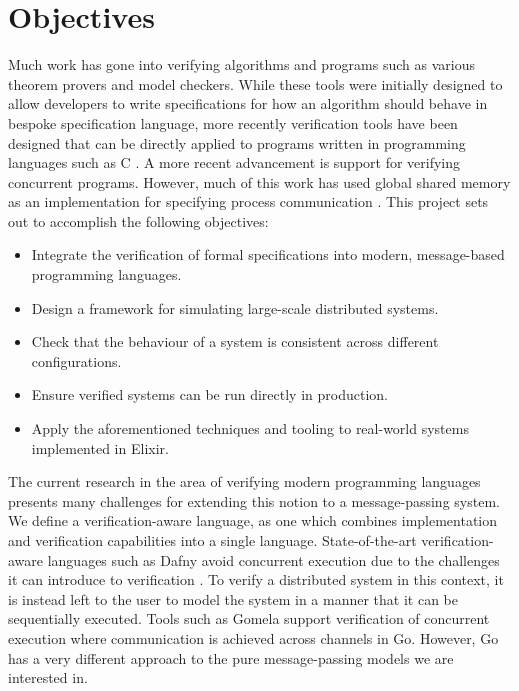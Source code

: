 \section{Objectives}
Much work has gone into verifying algorithms and programs such as various theorem provers and model checkers. While these tools were initially designed to allow developers to write specifications for how an algorithm should behave in bespoke specification language, more recently verification tools have been designed that can be directly applied to programs written in programming languages such as C \cite{c_to_promela}. A more recent advancement is support for verifying concurrent programs. However, much of this work has used global shared memory as an implementation for specifying process communication \cite{java_pathfinder}. 
This project sets out to accomplish the following objectives:
\begin{itemize}
    \item Integrate the verification of formal specifications into modern, message-based programming languages.
    \item Design a framework for simulating large-scale distributed systems.
    \item Check that the behaviour of a system is consistent across different configurations.
    \item Ensure verified systems can be run directly in production.
    \item Apply the aforementioned techniques and tooling to real-world systems implemented in Elixir.
\end{itemize}
The current research in the area of verifying modern programming languages presents many challenges for extending this notion to a message-passing system. We define a verification-aware language, as one which combines implementation and verification capabilities into a single language.  State-of-the-art verification-aware languages such as Dafny avoid concurrent execution due to the challenges it can introduce to verification \cite{dafny_concurrency}. To verify a distributed system in this context, it is instead left to the user to model the system in a manner that it can be sequentially executed. Tools such as Gomela \cite{gomela} support verification of concurrent execution where communication is achieved across channels in Go. However, Go has a very different approach to the pure message-passing models we are interested in.

